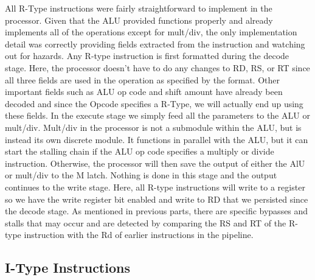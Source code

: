 \documentclass[letterpaper]{article} %
\begin{document}
All R-Type instructions were fairly straightforward to implement in the processor. Given that the ALU provided functions properly and already implements all of the operations except for mult/div, the only implementation detail was correctly providing fields extracted from the instruction and watching out for hazards. Any R-type instruction is first formatted during the decode stage. Here, the processor doesn't have to do any changes to RD, RS, or RT since all three fields are used in the operation as specified by the format. Other important fields such as ALU op code and shift amount have already been decoded and since the Opcode specifies a R-Type, we will actually end up using these fields. In the execute stage we simply feed all the parameters to the ALU or mult/div. Mult/div in the processor is not a submodule within the ALU, but is instead its own discrete module. It functions in parallel with the ALU, but it can start the stalling chain if the ALU op code specifies a multiply or divide instruction. Otherwise, the processor will then save the output of either the AlU or mult/div to the M latch. Nothing is done in this stage and the output continues to the write stage. Here, all R-type instructions will write to a register so we have the write register bit enabled and write to RD that we persisted since the decode stage. As mentioned in previous parts, there are specific bypasses and stalls that may occur and are detected by comparing the RS and RT of the R-type instruction with the Rd of earlier instructions in the pipeline.

\subsection*{I-Type Instructions}
\end{document}
